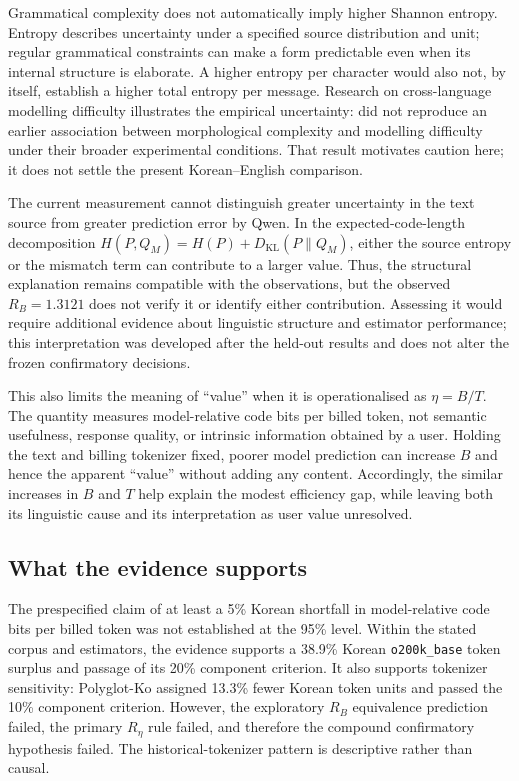 \documentclass[11pt,a4paper]{article}
\newcommand{\RB}{R_{B}}
\newcommand{\Reta}{R_{\eta}}
\begin{document}
Grammatical complexity does not automatically imply higher Shannon entropy.
Entropy describes uncertainty under a specified source distribution and
unit; regular grammatical constraints can make a form predictable even when
its internal structure is elaborate. A higher entropy per character would
also not, by itself, establish a higher total entropy per message. Research
on cross-language modelling difficulty illustrates the empirical uncertainty:
\citet{mielke2019} did not reproduce an earlier association between
morphological complexity and modelling difficulty under their broader
experimental conditions. That result motivates caution here; it does not
settle the present Korean--English comparison.

The current measurement cannot distinguish greater uncertainty in the text
source from greater prediction error by Qwen. In the expected-code-length
decomposition $H(P,Q_M)=H(P)+D_{\mathrm{KL}}(P\|Q_M)$, either the source
entropy or the mismatch term can contribute to a larger value. Thus, the
structural explanation remains compatible with the observations, but the
observed $\RB=1.3121$ does not verify it or identify either contribution.
Assessing it would require additional evidence about linguistic structure
and estimator performance; this interpretation was developed after the
held-out results and does not alter the frozen confirmatory decisions.

This also limits the meaning of ``value'' when it is operationalised as
$\eta=B/T$. The quantity measures model-relative code bits per billed token,
not semantic usefulness, response quality, or intrinsic information obtained
by a user. Holding the text and billing tokenizer fixed, poorer model
prediction can increase $B$ and hence the apparent ``value'' without adding
any content. Accordingly, the similar increases in $B$ and $T$ help explain
the modest efficiency gap, while leaving both its linguistic cause and its
interpretation as user value unresolved.

\subsection{What the evidence supports}

The prespecified claim of at least a 5\% Korean shortfall in model-relative
code bits per billed token was not established at the 95\% level. Within the
stated corpus and estimators, the evidence supports a 38.9\% Korean
\texttt{o200k\_base} token surplus and passage of its 20\% component
criterion. It also supports tokenizer sensitivity: Polyglot-Ko assigned
13.3\% fewer Korean token units and passed the 10\% component criterion.
However, the exploratory $\RB$ equivalence prediction failed, the primary
$\Reta$ rule failed, and therefore the compound confirmatory hypothesis
failed. The historical-tokenizer pattern is descriptive rather than causal.
\end{document}
